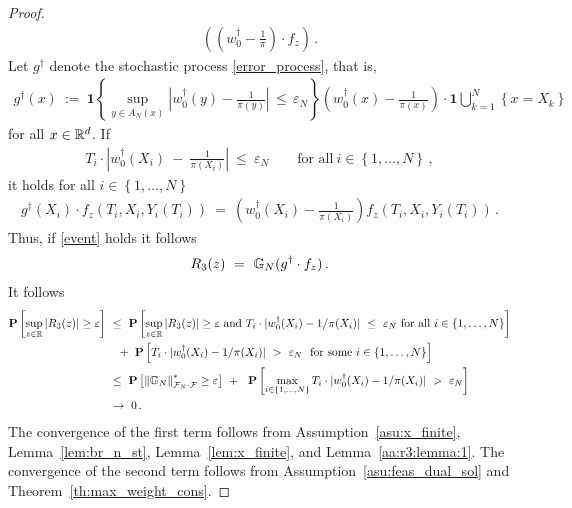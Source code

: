 \begin{proof}
\begin{align*}
    \left( 
      \left( 
      w_0^\dagger
      -
      \frac{1}{\pi}
      \right)
     \cdot
     f_z
    \right)
    \,.
  \end{align*}
Let
  $g^\dagger$ 
  denote the stochastic process \eqref{error_process}, that is,
\begin{align*}
  g^\dagger
  (x)
  \ 
  :=
  \ 
  \mathbf{1}{
    \left\{ 
      \sup_{y\in A_N(x)}
      \left| 
      w_0^\dagger(y)
      -
      \frac{1}{\pi(y)}
      \right|
      \,
      \le
      \,
      \varepsilon_N
    \right\}
  }
  \left( 
    w_0^\dagger(x)
      -
      \frac{1}{\pi(x)}
  \right)
  \cdot
  \mathbf{1}
  \bigcup_{k=1}^N
  \left\{ 
    x=X_k
  \right\}
\end{align*}
for all $x\in\mathbb{R}^d$.
  If
  \begin{gather}
    \label{event}
    T_i
    \cdot
    \left| 
    w_0^\dagger(X_i)
    \ 
    -
    \ 
    \frac{1}{\pi(X_i)} 
    \right|
    \ 
    \le
    \ 
    \varepsilon_N
    \qquad
    \text{for all}\ 
    i\in \left\{ 1,\ldots,N \right\}
    \,,
  \end{gather}
  it holds
  for all $i\in \left\{ 1,\ldots,N \right\}$
  \begin{gather}
    \label{7926}
    g^\dagger
    (X_i)
    \cdot
    f_z
    (T_i,X_i,Y_i(T_i))
    \ 
    =
    \ 
  \left( 
      w_0^\dagger(X_i)
      -
      \frac{1}{\pi(X_i)}
  \right)
    f_z
    (T_i,X_i,Y_i(T_i))
      \,.
  \end{gather}
  Thus, if \eqref{event} holds it follows
\begin{align*}
 R_3(z)
 \ 
 =
 \ 
 \G_N(g^\dagger \cdot f_z)
 \,.
\end{align*}
  It follows
\begin{align*}
    \P
    \left[ 
      \sup_{z\in\R}
     | 
    R_3(z)
    |
      \ge
      \varepsilon
    \right]
    &
    \ 
    \le
    \ 
    \P
    \left[ 
      \sup_{z\in\R}
     | 
    R_3(z)
    |
      \ge
      \varepsilon
      \ 
      \text{and}
      \ 
      T_i\cdot
    | 
    w_0^\dagger(X_i)- 1/\pi(X_i)
    |
    \ 
    \le
    \ 
    \varepsilon_N
    \ \text{for all}\ i\in\{1,\ldots,N\}
    \right]
    \\
    &
    \quad
    +
    \ 
    \P
    \left[ 
      T_i\cdot
    | 
    w_0^\dagger(X_i)- 1/\pi(X_i)
    |
    \ 
    >
    \ 
    \varepsilon_N
    \ 
    \ \text{for some}\ i\in\{1,\ldots,N\}
    \right]
    \\
    &
    \ 
    \le
    \ 
    \P
    \left[ 
      \norm{\G_N}^*_{\mathcal{F}_N\cdot\mathcal{F}}
      \ge
      \varepsilon
    \right]
    \ 
    +
    \ 
    \ 
    \P
    \left[ 
      \max_{i\in \left\{ 1,\ldots,N \right\}}
      T_i\cdot
    | 
    w_0^\dagger(X_i)- 1/\pi(X_i)
    |
    \ 
    >
    \ 
    \varepsilon_N
    \right]
    \\
    &
    \ 
    \to
    \ 
    0
    \,.
\end{align*}
The convergence of the first term follows from
Assumption~\ref{asu:x_finite},
Lemma~\ref{lem:br_n_st},
Lemma~\ref{lem:x_finite}, and
Lemma~\ref{aa:r3:lemma:1}.
The convergence of the second term follows from
Assumption~\ref{asu:feas_dual_sol} and
Theorem~\ref{th:max_weight_cons}.
\end{proof}
